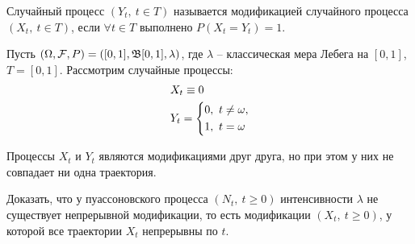 \begin{definition}
    Случайный процесс $(Y_t,\ t \in T)$ называется модификацией случайного процесса $(X_t,\ t \in T)$, если $\forall t \in T$ выполнено $P(X_t = Y_t) = 1$.
\end{definition}

\begin{example}
    Пусть $(\Omega, \mathcal{F}, P) = ([0, 1], \mathfrak{B}[0, 1], \lambda)$, где $\lambda$ -- классическая мера Лебега на $[0, 1]$, $T = [0, 1]$.  Рассмотрим случайные процессы:
    \begin{align*}
        & X_t \equiv 0
        \\
        & Y_t = \left\{\begin{aligned}
            & 0,\ t \neq \omega,
            \\
            & 1,\ t = \omega
        \end{aligned}\right.
    \end{align*}

    Процессы $X_t$ и $Y_t$ являются модификациями друг друга, но при этом у них не совпадает ни одна траектория.
\end{example}

\begin{problem}
    Доказать, что у пуассоновского процесса $(N_t,\ t \ge 0)$ интенсивности $\lambda$ не существует непрерывной модификации, то есть модификации $(X_t,\ t \ge 0)$, у которой все траектории $X_t$ непрерывны по $t$.
\end{problem}

